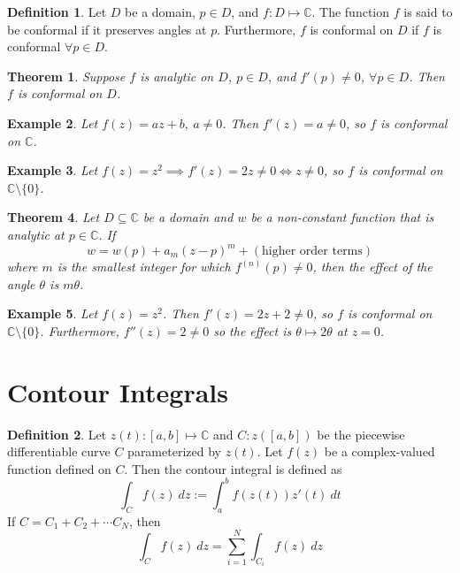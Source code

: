 \documentclass{article}
\newtheorem{theorem}{Theorem}[section]
\newtheorem{example}[theorem]{Example}
\theoremstyle{definition}
\newtheorem{definition}{Definition}[section]
\begin{document}
\begin{definition}
    Let $D$ be a domain, $p \in D$, and $f: D \mapsto \mathbb{C}$. The function $f$ is said to be conformal if it preserves angles at $p$. Furthermore, $f$ is conformal on $D$ if $f$ is conformal $\forall p \in D$.
\end{definition}

\begin{theorem}
    Suppose $f$ is analytic on $D$, $p \in D$, and $f'(p) \neq 0$, $\forall p \in D$. Then $f$ is conformal on $D$.
\end{theorem}

\begin{example} \normalfont
    Let $f(z) = az+b,\ a \neq 0$. Then $f'(z) = a \neq 0$, so $f$ is conformal on $\mathbb{C}$.
\end{example}

\begin{example} \normalfont
    Let $f(z) = z^2 \implies f'(z) = 2z \neq 0 \iff z \neq 0$, so $f$ is conformal on $\mathbb{C} \setminus \{0\}$.
\end{example}

\begin{theorem}
    Let $D \subseteq \mathbb{C}$ be a domain and $w$ be a non-constant function that is analytic at $p \in \mathbb{C}$. If
    \begin{equation*}
        w = w(p) + a_m (z-p)^m + (\text{higher order terms})
    \end{equation*}
    where $m$ is the smallest integer for which $f^{(n)}(p) \neq 0$, then the effect of the angle $\theta$ is $m\theta$.
\end{theorem}

\begin{example} \normalfont
    Let $f(z) = z^2$. Then $f'(z) = 2z + 2 \neq 0$, so $f$ is conformal on $\mathbb{C} \setminus \{0\}$. Furthermore, $f''(z) = 2 \neq 0$ so the effect is $\theta \mapsto 2 \theta$ at $z = 0$.
\end{example}


\section{Contour Integrals}

\begin{definition}
    Let $z(t): [a, b] \mapsto \mathbb{C}$ and $C: z([a, b])$ be the piecewise differentiable curve $C$ parameterized by $z(t)$. Let $f(z)$ be a complex-valued function defined on $C$. Then the contour integral is defined as
    \begin{equation*}
        \int_C f(z)\ dz := \int_a^b f(z(t)) z'(t)\ dt
    \end{equation*}
    If $C = C_1 + C_2 + \cdots C_N$, then
    \begin{equation*}
        \int_C f(z)\ dz = \sum_{i=1}^N \int_{C_i} f(z)\ dz
    \end{equation*}
\end{definition}
\end{document}
